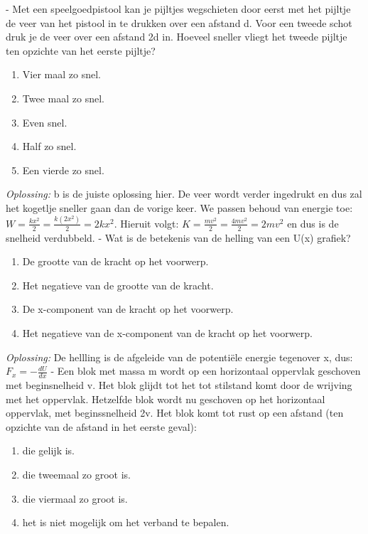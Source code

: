 \documentclass[12pt,a4paper]{article}
\begin{document}
	\newline
	- Met een speelgoedpistool kan je pijltjes wegschieten door eerst met het pijltje de veer van het pistool in te drukken over een afstand d. Voor een tweede schot druk je de veer over een afstand 2d in. Hoeveel sneller vliegt het tweede pijltje ten opzichte van het eerste pijltje?
	\begin{enumerate}[label=\alph*]
		\item Vier maal zo snel.
		\item Twee maal zo snel.
		\item Even snel.
		\item Half zo snel.
		\item Een vierde zo snel.
	\end{enumerate}
	\textit{Oplossing:} b is de juiste oplossing hier. De veer wordt verder ingedrukt en dus zal het kogetlje sneller gaan dan de vorige keer. We passen behoud van energie toe: \(W = \frac{kx^2}{2} = \frac{k(2x^2)}{2} = 2kx^2\). Hieruit volgt: \(K = \frac{mv^2}{2} = \frac{4mv^2}{2} = 2mv^2\) en dus is de snelheid verdubbeld.
	\newline
	- Wat is de betekenis van de helling van een U(x) grafiek?
	\begin{enumerate}[label=\alph*]
		\item De grootte van de kracht op het voorwerp.
		\item Het negatieve van de grootte van de kracht. 
		\item De x-component van de kracht op het voorwerp. 
		\item Het negatieve van de x-component van de kracht op het voorwerp. 
	\end{enumerate}
	\textit{Oplossing:} De hellling is de afgeleide van de potentiële energie tegenover x, dus: \(F_x = -\frac{dU}{dx}\)
	\newline
	- Een blok met massa m wordt op een horizontaal oppervlak geschoven met beginsnelheid v. Het blok glijdt tot het tot stilstand komt door de wrijving met het oppervlak. Hetzelfde blok wordt nu geschoven op het horizontaal oppervlak, met beginssnelheid 2v. Het blok komt tot rust op een afstand (ten opzichte van de afstand in het eerste geval):
	\begin{enumerate}[label=\alph*]
		\item die gelijk is.
		\item die tweemaal zo groot is.
		\item die viermaal zo groot is.
		\item het is niet mogelijk om het verband te bepalen. 
	\end{enumerate}
\end{document}
